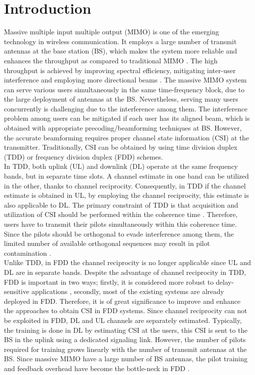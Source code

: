 \section{Introduction}
\label{sec:intro}
Massive multiple input multiple output (MIMO) is one of the emerging technology in wireless communication. It employs a large number of transmit antennas at the base station (BS), which makes the system more reliable and enhances the throughput as compared to traditional MIMO \cite{mimo-gain}. The high throughput is achieved by improving spectral efficiency, mitigating inter-user interference and employing more directional beams \cite{mimo-gain}. The massive MIMO system can serve various users simultaneously in the same time-frequency block, due to the large deployment of antennas at the BS. Nevertheless, serving many users concurrently is challenging due to the interference among them. The interference problem among users can be mitigated if each user has its aligned beam, which is obtained with appropriate precoding/beamforming techniques at BS. However, the accurate beamforming requires proper channel state information (CSI) at the transmitter. Traditionally, CSI can be obtained by using time division duplex (TDD) or frequency division duplex (FDD) schemes.\\ 
In TDD, both uplink (UL) and downlink (DL) operate at the same frequency bands, but in separate time slots. A channel estimate in one band can be utilized in the other, thanks to channel reciprocity. Consequently, in TDD if the channel estimate is obtained in UL, by employing the channel reciprocity, this estimate is also applicable to DL.  The primary constraint of TDD is that acquisition and utilization of CSI  should be performed within the coherence time \cite{mimo_eric2}. Therefore, users have to transmit their pilots simultaneously within this coherence time. Since the pilots should be orthogonal to evade interference among them, the limited number of available orthogonal sequences may result in pilot contamination \cite{mimo_eric2}.\\
Unlike TDD, in FDD the channel reciprocity is no longer applicable since UL  and  DL  are in separate bands. Despite the advantage of channel reciprocity in TDD, FDD is important in two ways; firstly, it is considered more robust to delay-sensitive applications \cite{FDD_or_TDD},  secondly, most of the existing systems are already deployed in FDD.  Therefore, it is of great significance to improve and enhance the approaches to obtain CSI in FDD systems.
Since channel reciprocity can not be exploited in FDD, DL and UL channels are separately estimated. Typically, the training is done in DL by estimating CSI at the users, this CSI is sent to the BS in the uplink using a dedicated signaling link. However, the number of pilots required for training grows linearly with the number of transmit antennas at the BS. Since massive MIMO have a large number of BS antennas, the pilot training and feedback overhead have become the bottle-neck in FDD \cite{Dict_learning}.

